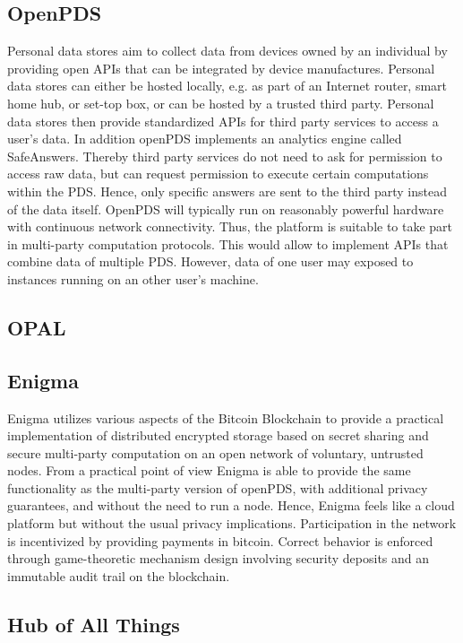 \documentclass[journal]{IEEEtran}
\begin{document}
\subsection{OpenPDS}

Personal data stores aim to collect data from devices owned by an individual by providing open APIs that can be integrated by device manufactures. Personal data stores can either be hosted locally, e.g. as part of an Internet router, smart home hub, or set-top box, or can be hosted by a trusted third party. Personal data stores then provide standardized APIs for third party services to access a user's data. In addition openPDS implements an analytics engine called SafeAnswers. Thereby third party services do not need to ask for permission to access raw data, but can request permission to execute certain computations within the PDS. Hence, only specific answers are sent to the third party instead of the data itself. OpenPDS will typically run on reasonably powerful hardware with continuous network connectivity. Thus, the platform is suitable to take part in multi-party computation protocols. This would allow to implement APIs that combine data of multiple PDS. However, data of one user may exposed to instances running on an other user's machine. 

\subsection{OPAL}

\subsection{Enigma}

Enigma utilizes various aspects of the Bitcoin Blockchain to provide a practical implementation of distributed encrypted storage based on secret sharing and secure multi-party computation on an open network of voluntary, untrusted nodes. From a practical point of view Enigma is able to provide the same functionality as the multi-party version of openPDS, with additional privacy guarantees, and without the need to run a node. Hence, Enigma feels like a cloud platform but without the usual privacy implications. Participation in the network is incentivized by providing payments in bitcoin. Correct behavior is enforced through game-theoretic mechanism design involving security deposits and an immutable audit trail on the blockchain. 


\subsection{Hub of All Things}
\end{document}
